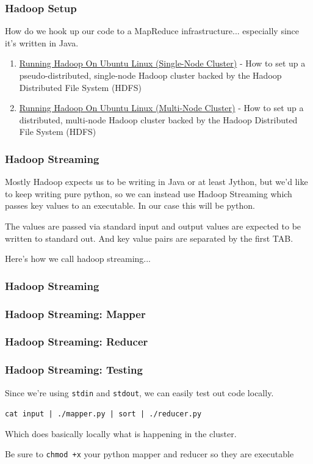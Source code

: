\documentclass{beamer}
\begin{document}
\begin{frame}
\frametitle{Hadoop Setup}

How do we hook up our code to a MapReduce infrastructure... especially since it's written in Java.
\begin{enumerate}
\item\textcolor{blue}{\href{http://www.michael-noll.com/tutorials/running-hadoop-on-ubuntu-linux-single-node-cluster/}{Running Hadoop On Ubuntu Linux (Single-Node Cluster)}} - How to set up a pseudo-distributed, single-node Hadoop cluster backed by the Hadoop Distributed File System (HDFS)
\item \textcolor{blue}{\href{http://www.michael-noll.com/tutorials/running-hadoop-on-ubuntu-linux-multi-node-cluster/}{Running Hadoop On Ubuntu Linux (Multi-Node Cluster)}} -  How to set up a distributed, multi-node Hadoop cluster backed by the Hadoop Distributed File System (HDFS)
\end{enumerate}
\end{frame}



\begin{frame}
\frametitle{Hadoop Streaming}
Mostly Hadoop expects us to be writing in Java or at least Jython, but we'd like to keep writing pure python, so we can instead use Hadoop Streaming which passes key values to an executable. In our case this will be python.

The values are passed via standard input and output values are expected to be written to standard out. And key value pairs are separated by the first TAB.
\end{frame}
\begin{frame}
Here's how we call hadoop streaming...
\frametitle{Hadoop Streaming}
\end{frame}

\begin{frame}
\frametitle{Hadoop Streaming: Mapper}
\lstset{basicstyle=\scriptsize}
\end{frame}

\begin{frame}
\frametitle{Hadoop Streaming: Reducer}
\lstset{basicstyle=\scriptsize}
\end{frame}

\begin{frame}
\frametitle{Hadoop Streaming: Testing}
Since we're using \texttt{stdin} and \texttt{stdout}, we can easily test out code locally.

\texttt{cat input | ./mapper.py | sort | ./reducer.py}

Which does basically locally what is happening in the cluster.

Be sure to \texttt{chmod +x} your python mapper and reducer so they are executable
\end{frame}
\end{document}
